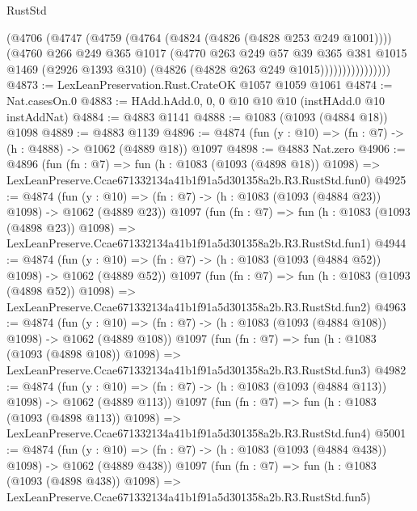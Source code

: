 \begin{lexlean}{RustStd}
\begin{coremodule}
                      (@4706
                        (@4747
                          (@4759
                            (@4764 (@4824 (@4826 (@4828 @253 @249 @1001))))
                            (@4760
                              @266
                              @249
                              @365
                              @1017
                              (@4770
                                @263
                                @249
                                @57
                                @39
                                @365
                                @381
                                @1015
                                @1469
                                (@2926 @1393 @310)
                                (@4826 (@4828 @263 @249 @1015))))))))))))))))
@4873 := LexLeanPreservation.Rust.CrateOK @1057 @1059 @1061
@4874 := Nat.casesOn.{0}
@4883 := HAdd.hAdd.{0, 0, 0} @10 @10 @10 (instHAdd.{0} @10 instAddNat)
@4884 := @4883 @1141
@4888 := @1083 (@1093 (@4884 @18)) @1098
@4889 := @4883 @1139
@4896 := @4874 (fun (y : @10) => (fn : @7) -> (h : @4888) -> @1062 (@4889 @18)) @1097
@4898 := @4883 Nat.zero
@4906 := @4896
    (fun (fn : @7) =>
    fun (h : @1083 (@1093 (@4898 @18)) @1098) =>
    LexLeanPreserve.Ccae671332134a41b1f91a5d301358a2b.R3.RustStd.fun0)
@4925 := @4874
    (fun (y : @10) => (fn : @7) -> (h : @1083 (@1093 (@4884 @23)) @1098) -> @1062 (@4889 @23))
    @1097
    (fun (fn : @7) =>
    fun (h : @1083 (@1093 (@4898 @23)) @1098) =>
    LexLeanPreserve.Ccae671332134a41b1f91a5d301358a2b.R3.RustStd.fun1)
@4944 := @4874
    (fun (y : @10) => (fn : @7) -> (h : @1083 (@1093 (@4884 @52)) @1098) -> @1062 (@4889 @52))
    @1097
    (fun (fn : @7) =>
    fun (h : @1083 (@1093 (@4898 @52)) @1098) =>
    LexLeanPreserve.Ccae671332134a41b1f91a5d301358a2b.R3.RustStd.fun2)
@4963 := @4874
    (fun (y : @10) => (fn : @7) -> (h : @1083 (@1093 (@4884 @108)) @1098) -> @1062 (@4889 @108))
    @1097
    (fun (fn : @7) =>
    fun (h : @1083 (@1093 (@4898 @108)) @1098) =>
    LexLeanPreserve.Ccae671332134a41b1f91a5d301358a2b.R3.RustStd.fun3)
@4982 := @4874
    (fun (y : @10) => (fn : @7) -> (h : @1083 (@1093 (@4884 @113)) @1098) -> @1062 (@4889 @113))
    @1097
    (fun (fn : @7) =>
    fun (h : @1083 (@1093 (@4898 @113)) @1098) =>
    LexLeanPreserve.Ccae671332134a41b1f91a5d301358a2b.R3.RustStd.fun4)
@5001 := @4874
    (fun (y : @10) => (fn : @7) -> (h : @1083 (@1093 (@4884 @438)) @1098) -> @1062 (@4889 @438))
    @1097
    (fun (fn : @7) =>
    fun (h : @1083 (@1093 (@4898 @438)) @1098) =>
    LexLeanPreserve.Ccae671332134a41b1f91a5d301358a2b.R3.RustStd.fun5)

\end{coremodule}
\end{lexlean}
